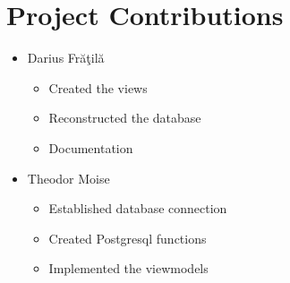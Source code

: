 \documentclass{article}
\begin{document}
\vspace{10pt}

\section{Project Contributions}
\begin{itemize}
    \item Darius Fr\u{a}\c{t}il\u{a}
    \begin{itemize}
        \item Created the views 
        \item Reconstructed the database
        \item Documentation
    \end{itemize}
    \item Theodor Moise
    \begin{itemize}
        \item Established database connection
        \item Created Postgresql functions
        \item Implemented the viewmodels
    \end{itemize}
\end{itemize}
\end{document}
